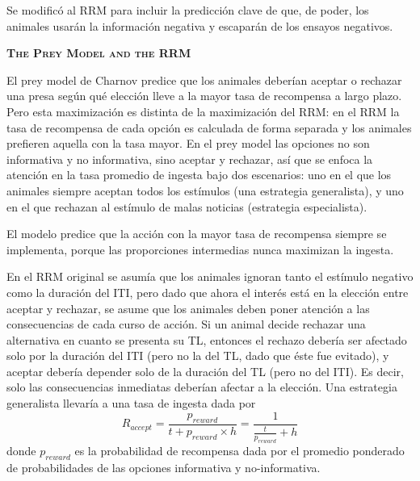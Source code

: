 \documentclass[a4paper,12pt]{article}
\begin{document}
Se modificó al RRM para incluir la predicción clave de que, de poder, los animales usarán la información negativa y escaparán de los ensayos negativos.

{\scshape\bfseries The Prey Model and the RRM}

El prey model de Charnov predice que los animales deberían aceptar o rechazar una presa según qué elección lleve a la mayor tasa de recompensa a largo plazo. Pero esta maximización es distinta de la maximización del RRM: en el RRM la tasa de recompensa de cada opción es calculada de forma separada y los animales prefieren aquella con la tasa mayor. En el prey model las opciones no son informativa y no informativa, sino aceptar y rechazar, así que se enfoca la atención en la tasa promedio de ingesta bajo dos escenarios: uno en el que los animales siempre aceptan todos los estímulos (una estrategia generalista), y uno en el que rechazan al estímulo de malas noticias (estrategia especialista).

El modelo predice que la acción con la mayor tasa de recompensa siempre se implementa, porque las proporciones intermedias nunca maximizan la ingesta.

En el RRM original se asumía que los animales ignoran tanto el estímulo negativo como la duración del ITI, pero dado que ahora el interés está en la elección entre aceptar y rechazar, se asume que los animales deben poner atención a las consecuencias de cada curso de acción. Si un animal decide rechazar una alternativa en cuanto se presenta su TL, entonces el rechazo debería ser afectado solo por la duración del ITI (pero no la del TL, dado que éste fue evitado), y aceptar debería depender solo de la duración del TL (pero no del ITI). Es decir, solo las consecuencias inmediatas deberían afectar a la elección. Una estrategia generalista llevaría a una tasa de ingesta dada por
$$
R_{accept}=\frac{p_{reward}}{t+p_{reward}\times h}=\frac {1}{\frac{t}{p_{reward}} + h}
$$
donde $p_{reward}$ es la probabilidad de recompensa dada por el promedio ponderado de probabilidades de las opciones informativa y no-informativa.
\end{document}
